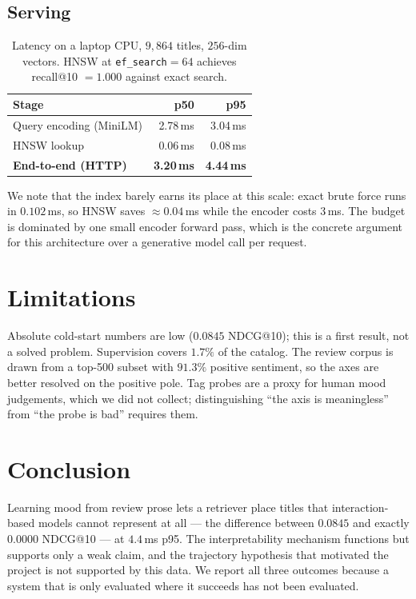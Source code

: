 \documentclass[11pt,a4paper]{article}
\begin{document}
\subsection{Serving}

\begin{table}[h]
\centering
\caption{Latency on a laptop CPU, $9{,}864$ titles, $256$-dim vectors. HNSW at
\texttt{ef\_search}$=64$ achieves recall@10 $=1.000$ against exact search.}
\begin{tabular}{lrr}
\toprule
Stage & p50 & p95 \\
\midrule
Query encoding (MiniLM)      & 2.78\,ms & 3.04\,ms \\
HNSW lookup                  & 0.06\,ms & 0.08\,ms \\
\textbf{End-to-end (HTTP)}   & \textbf{3.20\,ms} & \textbf{4.44\,ms} \\
\bottomrule
\end{tabular}
\end{table}

We note that the index barely earns its place at this scale: exact brute force
runs in $0.102$\,ms, so HNSW saves $\approx 0.04$\,ms while the encoder costs
$3$\,ms. The budget is dominated by one small encoder forward pass, which is the
concrete argument for this architecture over a generative model call per
request.

\section{Limitations}

Absolute cold-start numbers are low ($0.0845$ NDCG@10); this is a first result,
not a solved problem. Supervision covers $1.7\%$ of the catalog. The review
corpus is drawn from a top-500 subset with $91.3\%$ positive sentiment, so the
axes are better resolved on the positive pole. Tag probes are a proxy for human
mood judgements, which we did not collect; distinguishing ``the axis is
meaningless'' from ``the probe is bad'' requires them.

\section{Conclusion}

Learning mood from review prose lets a retriever place titles that
interaction-based models cannot represent at all --- the difference between
$0.0845$ and exactly $0.0000$ NDCG@10 --- at $4.4$\,ms p95. The interpretability
mechanism functions but supports only a weak claim, and the trajectory
hypothesis that motivated the project is not supported by this data. We report
all three outcomes because a system that is only evaluated where it succeeds has
not been evaluated.
\end{document}
